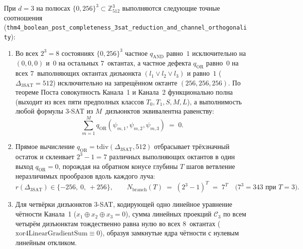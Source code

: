 \begin{theorem}
\label{thm:mono-post-3sat}
При $d = 3$ на полюсах $\{0, 256\}^3 \subset \mathbb{Z}_{512}^3$ выполняются следующие точные соотношения (\texttt{thm4\_\allowbreak boolean\_\allowbreak post\_\allowbreak completeness\_\allowbreak 3sat\_\allowbreak reduction\_\allowbreak and\_\allowbreak channel\_\allowbreak orthogonality}):
\begin{enumerate}[label=\textbf{\arabic*.},noitemsep]
\item Во всех $2^3 = 8$ состояниях $\{0, 256\}^3$ частное $q_{\mathrm{AND}}$ равно~$1$ исключительно на $(0,0,0)$ и~$0$ на остальных $7$~октантах, а частное дефекта $q_{\mathrm{OR}}$ равно~$0$ на всех $7$~выполняющих октантах дизъюнкта $(l_1 \lor l_2 \lor l_3)$ и равно~$1$ ($\Delta_{\mathrm{3SAT}} = 512$) исключительно на запрещённом октанте $(256, 256, 256)$. По теореме Поста совокупность Канала~1 и Канала~2 функционально полна (выходит из всех пяти предполных классов $T_0, T_1, S, M, L$), а выполнимость любой формулы 3-SAT из $M$~дизъюнктов эквивалентна равенству:
  \begin{equation}
    \label{eq:mono-3sat-sum-zero}
    \sum_{m=1}^M q_{\mathrm{OR}}(\psi_{m,1}, \psi_{m,2}, \psi_{m,3}) \;=\; 0.
  \end{equation}
\item Прямое вычисление $q_{\mathrm{OR}} = \mathrm{tdiv}(\Delta_{\mathrm{3SAT}}, 512)$ отбрасывает трёхзначный остаток и склеивает $2^3 - 1 = 7$ различных выполняющих октантов в один выход $q_{\mathrm{OR}} = 0$, порождая на обратном конусе глубины $T$ шагов ветвление неразличимых прообразов вдоль каждого луча:
  \begin{equation}
    \label{eq:mono-3sat-7t-branching}
    r(\Delta_{\mathrm{3SAT}}) \in \{-256,\ 0,\ +256\}, \qquad
    N_{\mathrm{branch}}(T) \;=\; (2^3 - 1)^T \;=\; 7^T \quad \bigl(7^3 = 343 \text{ при } T = 3\bigr).
  \end{equation}
\item Для четвёрки дизъюнктов 3-SAT, кодирующей одно линейное уравнение чётности Канала~1 ($x_1 \oplus x_2 \oplus x_3 = 0$), сумма линейных проекций $\mathcal{C}_3$ по всем четырём дизъюнктам тождественно равна нулю во всех $8$~октантах ($\mathrm{xor4LinearGradientSum} \equiv 0$), образуя замкнутые ядра чётности с нулевым линейным откликом.
\end{enumerate}
\end{theorem}

